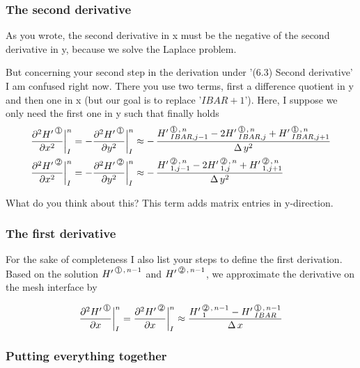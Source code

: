\subsubsection{The second derivative}
As you wrote, the second derivative in x must be the negative of the second derivative in y, because we solve the Laplace problem.

But concerning your second step in the derivation under '(6.3) Second derivative' I am confused right now. There you use two terms, first a difference quotient in y and then one in x (but our goal is to replace '$IBAR+1$'). Here, I suppose we only need the first one in y such that finally holds
\begin{align}
\label{BC-TSE}
 \frac{\HPNT{1}}{\DXPT} \bigg|_{I}^n  & = -  \frac{\HPNT{1}}{\DYPT}\bigg|_{I}^n   \approx 
                                                                  - \,\frac{\HL{IBAR,j-1}{1}{n} - 2 \HL{IBAR,j}{1}{n} + \HL{IBAR,j+1}{1}{n}}{\DYT}        \\                                                                 
 \frac{\HPNT{2}}{\DXPT} \bigg|_{I}^n  & = -  \frac{\HPNT{2}}{\DYPT}\bigg|_{I}^n   \approx 
                                                                  - \, \frac{\HL{1,j-1}{2}{n} - 2 \HL{1,j}{2}{n} + \HL{1,j+1}{2}{n}}{\DYT} 
\end{align}                                                                  

What do you think about this? This term adds matrix entries in y-direction.

\subsubsection{The first derivative}
For the sake of completeness I also list your steps to define the first derivation. Based on the solution
$\HL{\,}{1}{n-1}$ and $\HL{\,}{2}{n-1}$, we approximate the derivative on the mesh interface by

\[ \frac {\HPNT{1}}{\DXP}\bigg|_{I}^n  = \frac {\HPNT{2}}{\DXP}\bigg|_{I}^n \approx \frac{\HL{1}{2}{n-1} - \HL{IBAR}{1}{n-1}} {\DX}\]

\subsubsection{Putting everything together}

